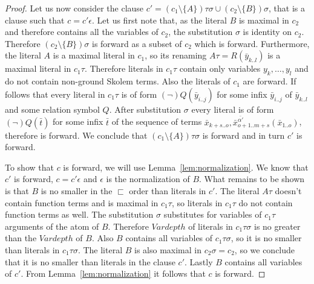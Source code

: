 \documentclass[english, shortabstract]{iithesis}
\theoremstyle{definition} \newtheorem{definition}{Definition}[chapter]
\theoremstyle{remark} \newtheorem{remark}[definition]{Observation}
\theoremstyle{plain} \newtheorem{theorem}[definition]{Theorem}
\theoremstyle{plain} \newtheorem{lemma}[definition]{Lemma}
\begin{document}
\begin{proof}
Let us now consider the clause $c'=(c_1\setminus\{A\})\tau\sigma \cup (c_2\setminus\{B\})\sigma$, 
that is a clause such that $c=c'\epsilon$.
Let us first note that, as the literal $B$ is maximal in $c_2$ and therefore contains all the variables of $c_2$, 
the substitution $\sigma$ is identity on $c_2$. Therefore $(c_2\setminus\{B\})\sigma$ is forward as a subset of $c_2$ which is forward.
Furthermore, the literal $A$ is a maximal literal in $c_1$, so its renaming $A\tau=R(\bar{y}_{k..l})$ is a maximal literal in $c_1\tau$.
Therefore literals in $c_1\tau$ contain only variables $y_k,\dots,y_l$ and do not contain non-ground Skolem terms.
Also the literals of $c_1$ are forward.
If follows that every literal in $c_1\tau$ is of form $(\lnot)Q(\bar{y}_{i..j})$ for some infix $\bar{y}_{i..j}$ of $\bar{y}_{k..l}$ and some relation symbol $Q$.
After substitution $\sigma$ every literal is of form $(\lnot)Q(\bar{t})$ for some infix $\bar{t}$ of the sequence of terms $\bar{x}_{k+s..o}, \bar{x}^{\bar{\alpha'}}_{{o+1..m+s}}(\bar{x}_{1..o})$, therefore is forward.
We conclude that $(c_1\setminus\{A\})\tau\sigma$ is forward and in turn $c'$ is forward.

To show that $c$ is forward, we will use Lemma~\ref{lem:normalization}.
We know that $c'$ is forward, $c=c'\epsilon$ and $\epsilon$ is the normalization of $B$.
What remains to be shown is that $B$ is no smaller in the $\sqsubset$ order than literals in $c'$.
The literal $A\tau$ doesn't contain function terms and is maximal in $c_1\tau$, 
so literals in $c_1\tau$ do not contain function terms as well.
The substitution $\sigma$ substitutes for variables of $c_1\tau$ arguments of the atom of $B$.
Therefore $\mathit{Vardepth}$ of literals in $c_1\tau\sigma$ is no greater than the $\mathit{Vardepth}$ of $B$.
Also $B$ contains all variables of $c_1\tau\sigma$, so it is no smaller than literals in $c_1\tau\sigma$.
The literal $B$ is also maximal in $c_2\sigma=c_2$, so we conclude that it is no smaller than literals in the clause $c'$.
Lastly $B$ contains all variables of $c'$. From Lemma~\ref{lem:normalization} it follows that $c$ is forward. 



\end{proof}
\end{document}
